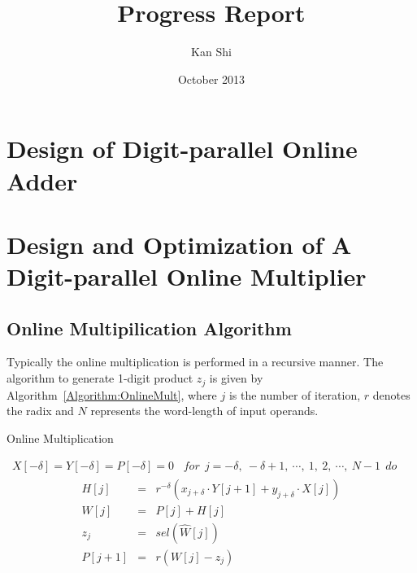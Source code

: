 \documentclass[a4paper, 11pt]{article}
\title{Progress Report}
\author{Kan Shi}
\date{October 2013}
\begin{document}
\maketitle
\vspace{-10mm}

\section{Design of Digit-parallel Online Adder}

\section{Design and Optimization of A Digit-parallel Online Multiplier}
\subsection{Online Multipilication Algorithm}

Typically the online multiplication is performed in a recursive manner. The algorithm to generate 1-digit product $z_j$ is given by Algorithm~\ref{Algorithm:OnlineMult}, where $j$ is the number of iteration, $r$ denotes the radix and $N$ represents the word-length of input operands. 
%
\begin{algorithm}[htbp]
  \caption{Online Multiplication}
  \begin{algorithmic}[1]

    \REQUIRE~$X[-\delta]=Y[-\delta]=P[-\delta]=0$
    \ENSURE~$for~~ j=-\delta,~-\delta+1,~\cdots,~1,~2,~\cdots,~N-1 ~~do$
      \begin{eqnarray}\label{Eq:OnlineMult_General}
        \begin{matrix}
          H[j]   & = & r^{-\delta}\left(x_{j+\delta}\cdot Y[j+1]+y_{j+\delta}\cdot X[j]\right)\\

          W[j]   & = & P[j] + H[j]\\
          z_j    & = & sel(\widehat{W}[j])\\
          P[j+1] & = & r\left(W[j]-z_j\right)
        \end{matrix}
      \end{eqnarray}

  \label{Algorithm:OnlineMult}
  \end{algorithmic}
\end{algorithm}
 
\end{document}
